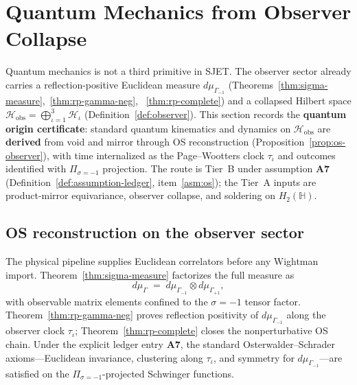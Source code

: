 \documentclass[aps,prd,onecolumn,amsmath,amssymb,nofootinbib,11pt]{revtex4-2}
\numberwithin{equation}{section}
\theoremstyle{plain}
\theoremstyle{definition}
\theoremstyle{remark}
\newcommand{\Quat}{\mathbb{H}}
\begin{document}
\section{Quantum Mechanics from Observer Collapse}
\label{sec:quantum-origin}

Quantum mechanics is not a third primitive in SJET. The observer sector
already carries a reflection-positive Euclidean measure $d\mu_{\Gamma_{-1}}$
(Theorems~\ref{thm:sigma-measure},~\ref{thm:rp-gamma-neg},
~\ref{thm:rp-complete}) and a collapsed Hilbert space
$\mathcal{H}_{\mathrm{obs}}=\bigoplus_{\iota=1}^3\mathcal{H}_\iota$
(Definition~\ref{def:observer}). This section records the \textbf{quantum
origin certificate}: standard quantum kinematics and dynamics on
$\mathcal{H}_{\mathrm{obs}}$ are \textbf{derived} from void and mirror through
OS reconstruction (Proposition~\ref{prop:os-observer}), with time internalized
as the Page--Wootters clock $\tau_\iota$ and outcomes identified with
$\Pi_{\sigma=-1}$ projection. The route is Tier~B under assumption
\textbf{A7} (Definition~\ref{def:assumption-ledger}, item~\ref{asm:os}); the
Tier~A inputs are product-mirror equivariance, observer collapse, and soldering
on $H_2(\Quat)$.

\subsection{OS reconstruction on the observer sector}

The physical pipeline supplies Euclidean correlators before any Wightman
import. Theorem~\ref{thm:sigma-measure} factorizes the full measure as
\begin{equation}\label{eq:qm-gamma-split}
  d\mu_\Gamma
  \;=\;
  d\mu_{\Gamma_{-1}}\otimes d\mu_{\Gamma_{+1}},
\end{equation}
with observable matrix elements confined to the $\sigma=-1$ tensor factor.
Theorem~\ref{thm:rp-gamma-neg} proves reflection positivity of
$d\mu_{\Gamma_{-1}}$ along the observer clock $\tau_\iota$; Theorem~\ref{thm:rp-complete}
closes the nonperturbative OS chain. Under the explicit ledger entry
\textbf{A7}, the standard Osterwalder--Schrader axioms---Euclidean invariance,
clustering along $\tau_\iota$, and symmetry for $d\mu_{\Gamma_{-1}}$---are
satisfied on the $\Pi_{\sigma=-1}$-projected Schwinger functions.
\end{document}
